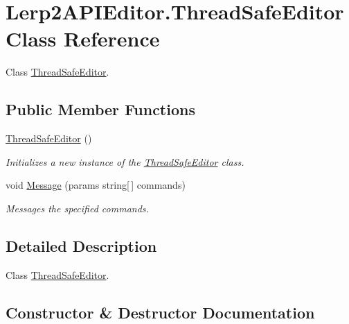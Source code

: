 \hypertarget{class_lerp2_a_p_i_editor_1_1_thread_safe_editor}{}\section{Lerp2\+A\+P\+I\+Editor.\+Thread\+Safe\+Editor Class Reference}
\label{class_lerp2_a_p_i_editor_1_1_thread_safe_editor}


Class \hyperlink{class_lerp2_a_p_i_editor_1_1_thread_safe_editor}{Thread\+Safe\+Editor}.  


\subsection*{Public Member Functions}
\begin{DoxyCompactItemize}
\item 
\hyperlink{class_lerp2_a_p_i_editor_1_1_thread_safe_editor_ac3f161faf9fb8b8eede380567865c6be}{Thread\+Safe\+Editor} ()
\begin{DoxyCompactList}\small\item\em Initializes a new instance of the \hyperlink{class_lerp2_a_p_i_editor_1_1_thread_safe_editor}{Thread\+Safe\+Editor} class. \end{DoxyCompactList}\item 
void \hyperlink{class_lerp2_a_p_i_editor_1_1_thread_safe_editor_a3e1b599ef5271b01d0ff5ef2a66dc83b}{Message} (params string\mbox{[}$\,$\mbox{]} commands)
\begin{DoxyCompactList}\small\item\em Messages the specified commands. \end{DoxyCompactList}\end{DoxyCompactItemize}


\subsection{Detailed Description}
Class \hyperlink{class_lerp2_a_p_i_editor_1_1_thread_safe_editor}{Thread\+Safe\+Editor}. 



\subsection{Constructor \& Destructor Documentation}
\mbox{\label{class_lerp2_a_p_i_editor_1_1_thread_safe_editor_ac3f161faf9fb8b8eede380567865c6be}} 
